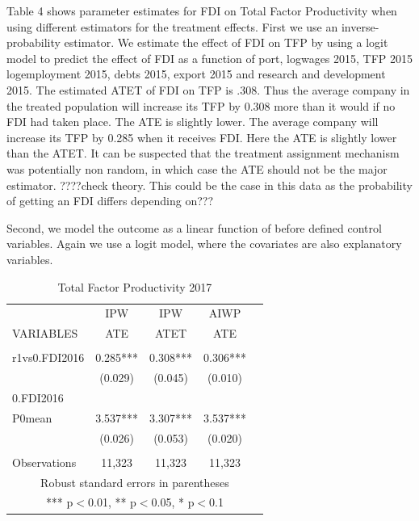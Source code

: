 \documentclass[a4paper,11pt]{scrartcl}
\begin{document}
\newpage
Table 4 shows parameter estimates for FDI on Total Factor Productivity  when using different  estimators for the treatment effects. First we use an inverse-probability estimator. We estimate the effect of FDI on TFP by using a logit model to predict the effect of FDI as a function of port,  logwages 2015, TFP 2015 logemployment 2015, debts 2015, export 2015 and research and development 2015. The estimated ATET of FDI on TFP is .308. Thus the average company in the treated population will increase its TFP by 0.308  more than it would if no FDI had taken place. The ATE is slightly lower. The average company will increase its TFP by 0.285 when it receives FDI. Here the ATE is slightly lower than the ATET. It can be suspected that the treatment assignment mechanism was potentially non random, in which case the ATE should not be the major estimator. ????check theory. This could be the case in this data as the probability of getting an FDI differs depending on???

Second, we model the outcome as a linear function of before defined control variables. Again we use a logit model, where the covariates are also explanatory variables.

\begin{table}[htbp]\centering
\caption{Total Factor Productivity 2017}
\begin{tabular}{lcccc} \hline
 & IPW  & IPW & AIWP \\
VARIABLES & ATE  & ATET  & ATE & \\ \hline
 &  &  &  \\
r1vs0.FDI2016 & 0.285***  & 0.308*** &   0.306***   \\
 \bigskip
 & (0.029)  & (0.045)  & (0.010)   \\

 
0.FDI2016  &   &    &  \\

P0mean &3.537***  &   3.307*** & 3.537***  \\

 &   (0.026) & (0.053) & (0.020) \\
 &  &  &    \\
 Observations & 11,323 & 11,323 & 11,323  \\ \hline
\multicolumn{7}{c}{ Robust standard errors in parentheses} \\
\multicolumn{7}{c}{ *** p$<$0.01, ** p$<$0.05, * p$<$0.1} \\
\end{tabular}
\end{table}
\end{document}
